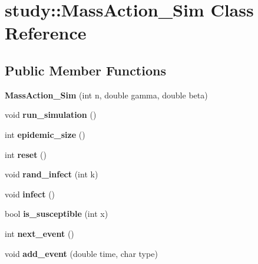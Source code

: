 \hypertarget{classstudy_1_1_mass_action___sim}{\section{study\-:\-:Mass\-Action\-\_\-\-Sim Class Reference}
\label{classstudy_1_1_mass_action___sim}
}
\subsection*{Public Member Functions}
\begin{DoxyCompactItemize}
\item 
\hypertarget{classstudy_1_1_mass_action___sim_a457c102e573262d8ac901b04afa51204}{{\bfseries Mass\-Action\-\_\-\-Sim} (int n, double gamma, double beta)}\label{classstudy_1_1_mass_action___sim_a457c102e573262d8ac901b04afa51204}

\item 
\hypertarget{classstudy_1_1_mass_action___sim_a55ec26c227335774ada962fed9ab75e0}{void {\bfseries run\-\_\-simulation} ()}\label{classstudy_1_1_mass_action___sim_a55ec26c227335774ada962fed9ab75e0}

\item 
\hypertarget{classstudy_1_1_mass_action___sim_a7cde7a0f54ea3593184c7a02179c87c2}{int {\bfseries epidemic\-\_\-size} ()}\label{classstudy_1_1_mass_action___sim_a7cde7a0f54ea3593184c7a02179c87c2}

\item 
\hypertarget{classstudy_1_1_mass_action___sim_a98d53a5168273e89615d44a3ef05eb76}{int {\bfseries reset} ()}\label{classstudy_1_1_mass_action___sim_a98d53a5168273e89615d44a3ef05eb76}

\item 
\hypertarget{classstudy_1_1_mass_action___sim_aa63fdc45e8dd02ca16562391916f9955}{void {\bfseries rand\-\_\-infect} (int k)}\label{classstudy_1_1_mass_action___sim_aa63fdc45e8dd02ca16562391916f9955}

\item 
\hypertarget{classstudy_1_1_mass_action___sim_a5479f5bdf662a2ec82019c7e1638fa0b}{void {\bfseries infect} ()}\label{classstudy_1_1_mass_action___sim_a5479f5bdf662a2ec82019c7e1638fa0b}

\item 
\hypertarget{classstudy_1_1_mass_action___sim_a7a9ebda1f21225bd368b01a891c1d34a}{bool {\bfseries is\-\_\-susceptible} (int x)}\label{classstudy_1_1_mass_action___sim_a7a9ebda1f21225bd368b01a891c1d34a}

\item 
\hypertarget{classstudy_1_1_mass_action___sim_a39a461c352e04858e825cbecf7fb2b28}{int {\bfseries next\-\_\-event} ()}\label{classstudy_1_1_mass_action___sim_a39a461c352e04858e825cbecf7fb2b28}

\item 
\hypertarget{classstudy_1_1_mass_action___sim_afc28fa84d79b6eb515f893c16f2e70f6}{void {\bfseries add\-\_\-event} (double time, char type)}\label{classstudy_1_1_mass_action___sim_afc28fa84d79b6eb515f893c16f2e70f6}

\end{DoxyCompactItemize}
